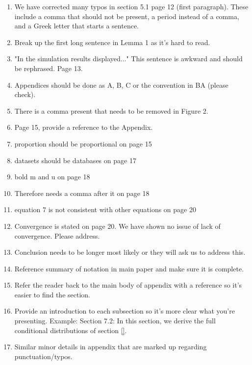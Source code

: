 \documentclass[letterpaper, parskip]{scrartcl}
\begin{document}
\begin{enumerate}
\item We have corrected many typos in section 5.1 page 12 (first paragraph). These include a comma that should not be present, a period instead of a comma, and a Greek letter that starts a sentence.
\item Break up the first long sentence in Lemma 1 as it's hard to read. 
\item "In the simulation results displayed..." This sentence is awkward and should be rephrased. Page 13. 
\item Appendices should be done as A, B, C or the convention in BA (please check). 
\item There is a comma present that needs to be removed in Figure 2. 
\item Page 15, provide a reference to the Appendix.
\item proportion should be proportional on page 15
\item datasets should be databases on page 17
\item bold m and u on page 18
\item Therefore needs a comma after it on page 18
\item equation 7 is not consistent with other equations on page 20
\item Convergence is stated on page 20. We have shown no issue of lack of convergence. Please address. 
\item Conclusion needs to be longer most likely or they will ask us to address this. 
\item Reference summary of notation in main paper and make sure it is complete. 
\item Refer the reader back to the main body of appendix with a reference so it's easier to find the section. 
\item Provide an introduction to each subsection so it's more clear what you're presenting. Example: Section 7.2: In this section, we derive the full conditional distributions of section \ref{}. 
\item Similar minor details in appendix that are marked up regarding punctuation/typos.
\end{enumerate}
\end{document}
